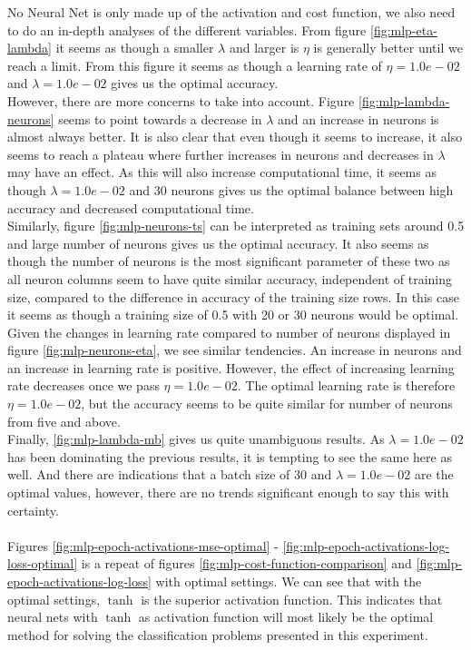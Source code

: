 No Neural Net is only made up of the activation and cost function, we also need to do an in-depth analyses of the different variables. From figure \ref{fig:mlp-eta-lambda} it seems as though a smaller $\lambda$ and larger is $\eta$ is generally better until we reach a limit. From this figure it seems as though a learning rate of $\eta = 1.0e-02$ and $\lambda = 1.0e-02$ gives us the optimal accuracy. \\ 
However, there are more concerns to take into account. Figure \ref{fig:mlp-lambda-neurons} seems to point towards a decrease in $\lambda$ and an increase in neurons is almost always better. It is also clear that even though it seems to increase, it also seems to reach a plateau where further increases in neurons and decreases in $\lambda$ may have an effect. As this will also increase computational time, it seems as though $\lambda = 1.0e-02$ and 30 neurons gives us the optimal balance between high accuracy and decreased computational time. \\
Similarly, figure \ref{fig:mlp-neurons-ts} can be interpreted as training sets around 0.5 and large number of neurons gives us the optimal accuracy. It also seems as though the number of neurons is the most significant parameter of these two as all neuron columns seem to have quite similar accuracy, independent of training size, compared to the difference in accuracy of the training size rows. In this case it seems as though a training size of 0.5 with 20 or 30 neurons would be optimal. \\
Given the changes in learning rate compared to number of neurons displayed in figure \ref{fig:mlp-neurons-eta}, we see similar tendencies. An increase in neurons and an increase in learning rate is positive. However, the effect of increasing learning rate decreases once we pass $\eta = 1.0e-02$. The optimal learning rate is therefore $\eta = 1.0e-02$, but the accuracy seems to be quite similar for number of neurons from five and above. \\ 
Finally, \ref{fig:mlp-lambda-mb} gives us quite unambiguous results. As $\lambda = 1.0e-02$ has been dominating the previous results, it is tempting to see the same here as well. And there are indications that a batch size of 30 and $\lambda = 1.0e-02$ are the optimal values, however, there are no trends significant enough to say this with certainty. \\ \\
Figures \ref{fig:mlp-epoch-activations-mse-optimal} - \ref{fig:mlp-epoch-activations-log-loss-optimal} is a repeat of figures \ref{fig:mlp-cost-function-comparison} and \ref{fig:mlp-epoch-activations-log-loss} with optimal settings. We can see that with the optimal settings, $\tanh$ is the superior activation function. This indicates that neural nets with $\tanh$ as activation function will most likely be the optimal method for solving the classification problems presented in this experiment.
